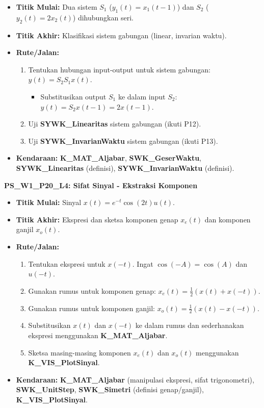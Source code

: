 \documentclass[
  letterpaper,
  DIV=11,
  numbers=noendperiod]{scrreprt}
\providecommand{\tightlist}{%
  \setlength{\itemsep}{0pt}\setlength{\parskip}{0pt}}
\begin{document}
\begin{itemize}
\tightlist
\item
  \textbf{Titik Mulai:} Dua sistem \(S_1\) (\(y_1(t) = x_1(t-1)\)) dan
  \(S_2\) (\(y_2(t) = 2x_2(t)\)) dihubungkan seri.
\item
  \textbf{Titik Akhir:} Klasifikasi sistem gabungan (linear, invarian
  waktu).
\item
  \textbf{Rute/Jalan:}

  \begin{enumerate}
  \def\labelenumi{\arabic{enumi}.}
  \tightlist
  \item
    Tentukan hubungan input-output untuk sistem gabungan:
    \(y(t) = S_2{S_1{x(t)}}\).

    \begin{itemize}
    \tightlist
    \item
      Substitusikan output \(S_1\) ke dalam input \(S_2\):
      \(y(t) = S_2{x(t-1)} = 2x(t-1)\).
    \end{itemize}
  \item
    Uji \textbf{SYWK\_Linearitas} sistem gabungan (ikuti P12).
  \item
    Uji \textbf{SYWK\_InvarianWaktu} sistem gabungan (ikuti P13).
  \end{enumerate}
\item
  \textbf{Kendaraan:} \textbf{K\_MAT\_Aljabar},
  \textbf{SWK\_GeserWaktu}, \textbf{SYWK\_Linearitas} (definisi),
  \textbf{SYWK\_InvarianWaktu} (definisi).
\end{itemize}

\textbf{PS\_W1\_P20\_L4: Sifat Sinyal - Ekstraksi Komponen}

\begin{itemize}
\tightlist
\item
  \textbf{Titik Mulai:} Sinyal \(x(t) = e^{-t} \cos(2t) u(t)\).
\item
  \textbf{Titik Akhir:} Ekspresi dan sketsa komponen genap \(x_e(t)\)
  dan komponen ganjil \(x_o(t)\).
\item
  \textbf{Rute/Jalan:}

  \begin{enumerate}
  \def\labelenumi{\arabic{enumi}.}
  \tightlist
  \item
    Tentukan ekspresi untuk \(x(-t)\). Ingat \(\cos(-A) = \cos(A)\) dan
    \(u(-t)\).
  \item
    Gunakan rumus untuk komponen genap:
    \(x_e(t) = \frac{1}{2} (x(t) + x(-t))\).
  \item
    Gunakan rumus untuk komponen ganjil:
    \(x_o(t) = \frac{1}{2} (x(t) - x(-t))\).
  \item
    Substitusikan \(x(t)\) dan \(x(-t)\) ke dalam rumus dan sederhanakan
    ekspresi menggunakan \textbf{K\_MAT\_Aljabar}.
  \item
    Sketsa masing-masing komponen \(x_e(t)\) dan \(x_o(t)\) menggunakan
    \textbf{K\_VIS\_PlotSinyal}.
  \end{enumerate}
\item
  \textbf{Kendaraan:} \textbf{K\_MAT\_Aljabar} (manipulasi ekspresi,
  sifat trigonometri), \textbf{SWK\_UnitStep}, \textbf{SWK\_Simetri}
  (definisi genap/ganjil), \textbf{K\_VIS\_PlotSinyal}.
\end{itemize}
\end{document}

